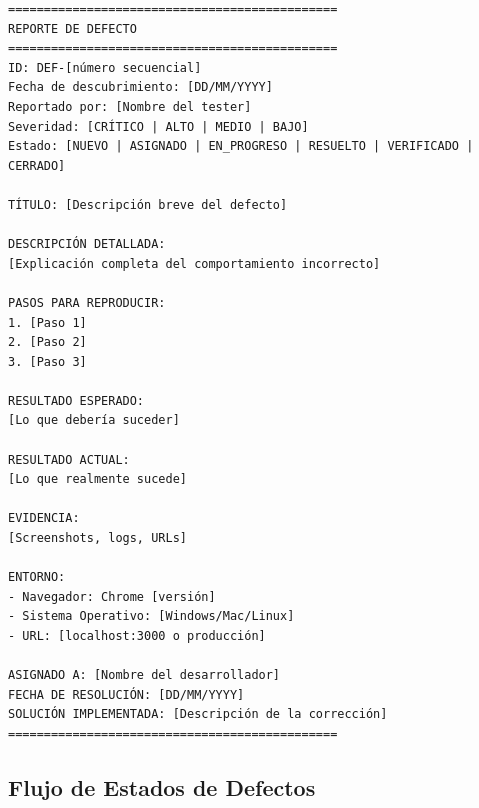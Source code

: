 \documentclass[12pt,a4paper]{article}
\begin{document}
\begin{verbatim}
==============================================
REPORTE DE DEFECTO
==============================================
ID: DEF-[número secuencial]
Fecha de descubrimiento: [DD/MM/YYYY]
Reportado por: [Nombre del tester]
Severidad: [CRÍTICO | ALTO | MEDIO | BAJO]
Estado: [NUEVO | ASIGNADO | EN_PROGRESO | RESUELTO | VERIFICADO | CERRADO]

TÍTULO: [Descripción breve del defecto]

DESCRIPCIÓN DETALLADA:
[Explicación completa del comportamiento incorrecto]

PASOS PARA REPRODUCIR:
1. [Paso 1]
2. [Paso 2]
3. [Paso 3]

RESULTADO ESPERADO:
[Lo que debería suceder]

RESULTADO ACTUAL:
[Lo que realmente sucede]

EVIDENCIA:
[Screenshots, logs, URLs]

ENTORNO:
- Navegador: Chrome [versión]
- Sistema Operativo: [Windows/Mac/Linux]
- URL: [localhost:3000 o producción]

ASIGNADO A: [Nombre del desarrollador]
FECHA DE RESOLUCIÓN: [DD/MM/YYYY]
SOLUCIÓN IMPLEMENTADA: [Descripción de la corrección]
==============================================
\end{verbatim}

\subsection{Flujo de Estados de Defectos}

\begin{center}
\end{center}
\end{document}

